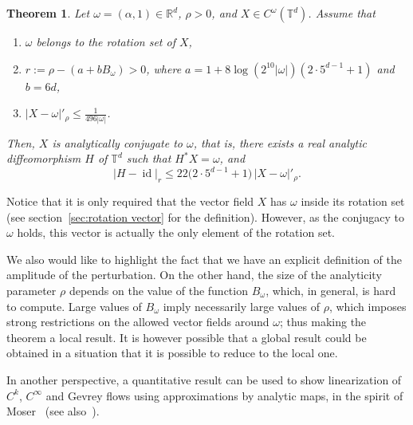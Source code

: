 \documentclass[12pt,reqno,a4paper]{amsart}%
\numberwithin{equation}{section}
\newtheorem{theorem}{Theorem}[section]
\newcommand{\Rr}{{\mathbb{R}}}
\newcommand{\Tt}{{\mathbb{T}}}
\newcommand{\id}  {\operatorname{id}}
\begin{document}
\begin{theorem}\label{thm: main}
Let $\omega = (\alpha,1) \in \Rr^d$, $\rho > 0$, and $X \in C^\omega(\Tt^d)$. Assume that
\begin{enumerate}
\item $\omega$ belongs to  the rotation set of $X$,
\item $r:=\rho -( a + b B_\omega)>0$, where $a =  1+ 8\log(2^{10}|\omega|)(2 \cdot 5^{d-1} + 1)$ and $b = 6d$,
\item $|X-\omega|'_\rho \le \frac{1}{496 |\omega|}$.
\end{enumerate}
Then, $X$ is analytically conjugate to $\omega$, that is, there exists a real analytic diffeomorphism $H$ of $\Tt^d$ such that $H^*X=\omega$, and
$$
|H - \id|_r \le 22\bigl(2 \cdot 5^{d-1} + 1\bigr)\, |X-\omega|'_\rho.
$$
\end{theorem}


Notice that it is only required that the vector field $X$ has $\omega$ inside its rotation set (see section~\ref{sec:rotation vector} for the definition). However, as the conjugacy to $\omega$ holds, this vector is actually the only element of the rotation set.

We also would like to highlight the fact that we have an explicit definition of the amplitude of the perturbation.
On the other hand, the size of the analyticity parameter $\rho$ depends on the value of the function $B_\omega$, which, in general, is hard to compute.
Large values of $B_\omega$ imply necessarily large values of $\rho$, which imposes strong restrictions on the allowed vector fields around $\omega$; thus making the theorem a local result.
It is however possible that a global result could be obtained in a situation that it is possible to reduce to the  local one.

In another perspective, a quantitative result can be used to show linearization of $C^k$, $C^\infty$ and Gevrey flows using approximations by analytic maps, in the spirit of Moser~\cite{Moser1966II} (see also~\cite{Popov2004,Bounemoura2022,chierchia2003kam}).
\end{document}
